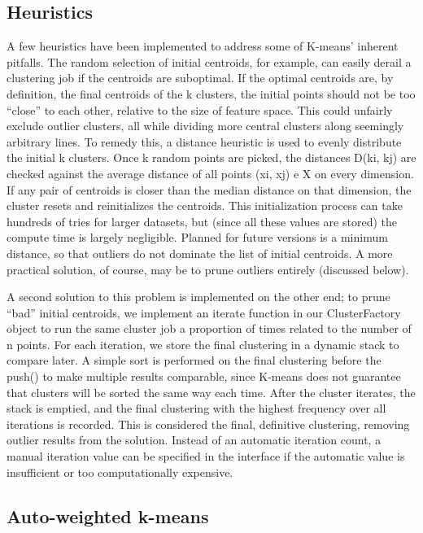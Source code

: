 \documentclass[10pt,twocolumn]{article}
\begin{document}
\subsection{Heuristics}

A few heuristics have been implemented to address some of K-means’ inherent pitfalls. The random selection of initial centroids, for example, can easily derail a clustering job if the centroids are suboptimal. If the optimal centroids are, by definition, the final centroids of the k clusters, the initial points should not be too “close” to each other, relative to the size of feature space. This could unfairly exclude outlier clusters, all while dividing more central clusters along seemingly arbitrary lines. To remedy this, a distance heuristic is used to evenly distribute the initial k clusters. \cite{Zerbst} Once k random points are picked, the distances D(ki, kj) are checked against the average distance of all points (xi, xj) e X on every dimension. If any pair of centroids is closer than the median distance on that dimension, the cluster resets and reinitializes the centroids. This initialization process can take hundreds of tries for larger datasets, but (since all these values are stored) the compute time is largely negligible. Planned for future versions is a minimum distance, so that outliers do not dominate the list of initial centroids. A more practical solution, of course, may be to prune outliers entirely (discussed below).


A second solution to this problem is implemented on the other end; to prune “bad” initial centroids, we implement an iterate function in our ClusterFactory object to run the same cluster job a proportion of times related to the number of n points. For each iteration, we store the final clustering in a dynamic stack to compare later. A simple sort is performed on the final clustering before the push() to make multiple results comparable, since K-means does not guarantee that clusters will be sorted the same way each time. After the cluster iterates, the stack is emptied, and the final clustering with the highest frequency over all iterations is recorded. This is considered the final, definitive clustering, removing outlier results from the solution. Instead of an automatic iteration count, a manual iteration value can be specified in the interface if the automatic value is insufficient or too computationally expensive.

\subsection{Auto-weighted k-means}
\end{document}

